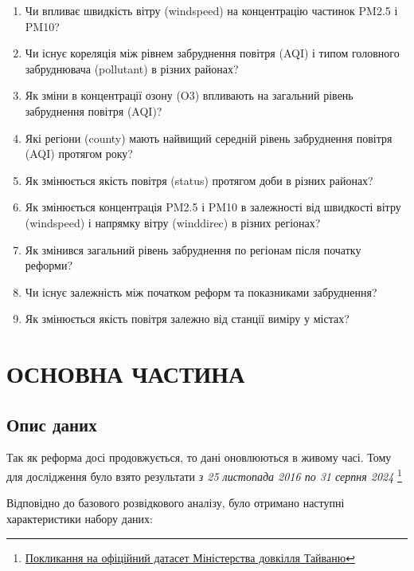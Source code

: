 \documentclass{article}
\begin{document}
\begin{enumerate}
    \item Чи впливає швидкість вітру (windspeed) на концентрацію частинок PM2.5 і PM10?
    \item Чи існує кореляція між рівнем забруднення повітря (AQI) і типом головного забруднювача (pollutant) в різних районах?
    \item Як зміни в концентрації озону (O3) впливають на загальний рівень забруднення повітря (AQI)?
    \item Які регіони (county) мають найвищий середній рівень забруднення повітря (AQI) протягом року?
    \item Як змінюється якість повітря (status) протягом доби в різних районах?
    \item Як змінюється концентрація PM2.5 і PM10 в залежності від швидкості вітру (windspeed) і напрямку вітру (winddirec) в різних регіонах?
    \item Як змінився загальний рівень забруднення по регіонам після початку реформи? 
    \item Чи існує залежність між початком реформ та показниками забруднення? 
    \item Як змінюється якість повітря залежно від станції виміру у містах?
\end{enumerate}

    
\newpage
\section{ОСНОВНА ЧАСТИНА}
\subsection{Опис даних}
Так як реформа досі продовжується, то дані оновлюються в живому часі. Тому для дослідження було взято результати \textit{з 25 листопада 2016 по 31 серпня 2024}
\footnote{\href{https://data.moenv.gov.tw/en/dataset/detail/aqx_p_488}{Покликання на офіційний датасет Міністерства довкілля Тайваню}}

Відповідно до базового розвідкового аналізу, було отримано наступні характеристики набору даних: 
\end{document}
